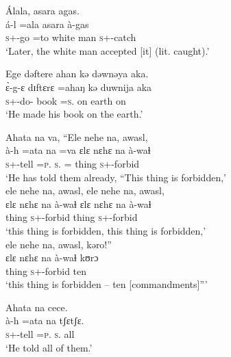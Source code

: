 \ea Álala,  asara  agas.\\
 \gll á-l     =ala    asara     à-gas\\
 \textsc{s}+{\IFV}-go =to    {white man}  \textsc{s}+{\PFV}-catch\\
 \glt ‘Later, the white man accepted [it] (lit. caught).’
 \z

\ea Ege  dəftere  ahan  kə  dəwnəya  aka.\\
 \gll \`ɛ{}-g-ɛ     dɪftɛrɛ   =ahaŋ          kə   duwnija    aka\\
 \textsc{s}+{\PFV}-do-{\CL}  book  =\textsc{s}.{\POSS}       on  earth    on\\
 \glt ‘He made his book on the earth.’ 
 \z

\ea Ahata  na  va,  “Ele nehe na, awasl,\\
 \gll à-h    =ata   na        =va      ɛlɛ     nɛhɛ      na    à-waɬ\\ 
 \textsc{s}+{\PFV}-tell  =\textsc{p}.{\IO}   \textsc{s}.{\DO}  ={\PRF}   thing  {\DEM}  {\PSP}  \textsc{s}+{\PFV}-forbid  \\
 \glt ‘He has told them already, “This thing is forbidden,’\\
 
 \medskip
  ele nehe na, awasl, ele nehe na, awasl,\\
 \gll ɛlɛ       nɛhɛ     na      à-waɬ    ɛlɛ       nɛhɛ       na      à-waɬ \\
 thing    {\DEM}     {\PSP}   \textsc{s}+{\PFV}-forbid  thing    {\DEM}     {\PSP}   \textsc{s}+{\PFV}-forbid    \\
 \glt ‘this thing is forbidden, this thing is forbidden,’\\
 
 \medskip
 ele nehe na, awasl, kəro!”\\
 \gll ɛlɛ       nɛhɛ     na     à-waɬ    kʊrɔ\\
 thing    {\DEM}     {\PSP}   \textsc{s}+{\PFV}-forbid    ten\\
 \glt ‘this thing is forbidden – ten [commandments]”’\\
\z

\ea   Ahata  na  cece.\\
 \gll à-h    =ata   na   tʃɛtʃɛ.\\
 \textsc{s}+{\PFV}-tell  =\textsc{p}.{\IO}  \textsc{s}.{\DO}  all\\
 \glt ‘He told all of them.’ 
 \z

